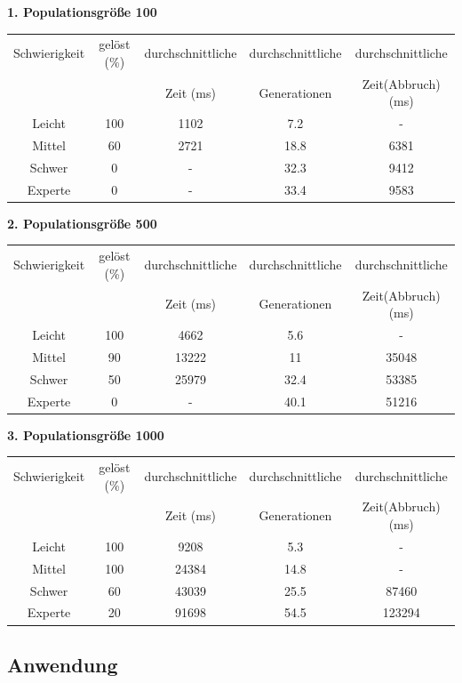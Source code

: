 \textbf{1. Populationsgröße 100}
\newline
\begin{tabular}{c|c|c|c|c}
    Schwierigkeit & gelöst (\%) & durchschnittliche & durchschnittliche & durchschnittliche  \\
     & & Zeit (ms) & Generationen & Zeit(Abbruch) (ms)\\
    \hline
    Leicht & 100 & 1102 & 7.2 & - \\
    Mittel & 60 & 2721 & 18.8 & 6381 \\
    Schwer & 0 & - & 32.3 & 9412 \\
    Experte & 0 & - & 33.4 & 9583 \\
\end{tabular}
\newpage
\noindent\textbf{2. Populationsgröße 500}
\newline
\begin{tabular}{c|c|c|c|c}
    Schwierigkeit & gelöst (\%) & durchschnittliche & durchschnittliche & durchschnittliche  \\
     & & Zeit (ms) & Generationen & Zeit(Abbruch) (ms)\\
    \hline
    Leicht & 100 & 4662 & 5.6 & - \\
    Mittel & 90 & 13222 & 11 & 35048 \\
    Schwer & 50 & 25979 & 32.4 & 53385 \\
    Experte & 0 & - & 40.1 & 51216 \\
\end{tabular}
\vspace{0.5cm}
\newline
\textbf{3. Populationsgröße 1000}
\newline
\begin{tabular}{c|c|c|c|c}
    Schwierigkeit & gelöst (\%) & durchschnittliche & durchschnittliche & durchschnittliche  \\
     & & Zeit (ms) & Generationen & Zeit(Abbruch) (ms)\\
    \hline
    Leicht & 100 & 9208 & 5.3 & - \\
    Mittel & 100 & 24384 & 14.8 & - \\
    Schwer & 60 & 43039 & 25.5 & 87460 \\
    Experte & 20 & 91698 & 54.5 & 123294 \\
\end{tabular}

\subsection*{Anwendung}

